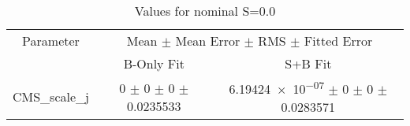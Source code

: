 \begin{table}
\centering
\caption{Values for nominal S=0.0}
\begin{tabular}{ccc}
\toprule
Parameter & \multicolumn{2}{c}{Mean $\pm$ Mean Error $\pm$ RMS $\pm$ Fitted Error}\\
 & B-Only Fit & S+B Fit\\
\midrule
CMS\_scale\_j & \num{0} $\pm$ \num{0} $\pm$ \num{0} $\pm$ \num{0.0235533} & \num{6.19424e-07} $\pm$ \num{0} $\pm$ \num{0} $\pm$ \num{0.0283571}\\
\bottomrule
\end{tabular}
\end{table}